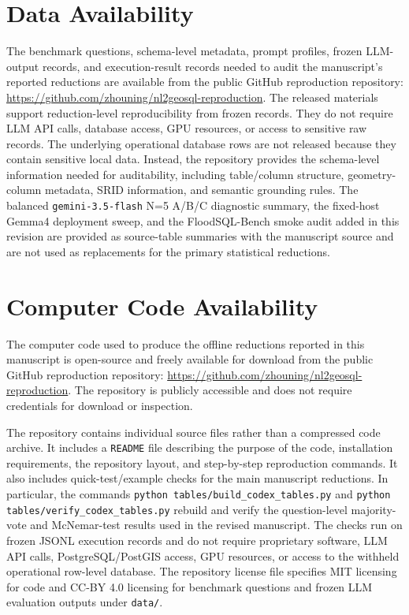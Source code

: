 \documentclass[11pt]{article}
\begin{document}
\section*{Data Availability}

{\sloppy
The benchmark questions, schema-level metadata, prompt profiles, frozen
LLM-output records, and execution-result records needed to audit the
manuscript's reported reductions are available from the public GitHub
reproduction repository:
\url{https://github.com/zhouning/nl2geosql-reproduction}.
The released materials support reduction-level reproducibility from frozen
records. They do not require LLM API calls, database access, GPU resources, or
access to sensitive raw records. The underlying operational database rows are
not released because they contain sensitive local data. Instead, the repository
provides the schema-level information needed for auditability, including
table/column structure, geometry-column metadata, SRID information, and semantic
grounding rules. The balanced \texttt{gemini-3.5-flash} N=5 A/B/C diagnostic
summary, the fixed-host Gemma4 deployment sweep, and the FloodSQL-Bench smoke
audit added in this revision are provided as source-table summaries with the
manuscript source and are not used as replacements for the primary statistical
reductions.
\par}

\section*{Computer Code Availability}

{\sloppy
The computer code used to produce the offline reductions reported in this
manuscript is open-source and freely available for download from the public
GitHub reproduction repository:
\url{https://github.com/zhouning/nl2geosql-reproduction}. The repository is
publicly accessible and does not require credentials for download or inspection.

The repository contains individual source files rather than a compressed code
archive. It includes a \texttt{README} file describing the purpose of the code,
installation requirements, the repository layout, and step-by-step reproduction
commands. It also includes quick-test/example checks for the main manuscript
reductions. In particular, the commands \texttt{python
tables/build\_codex\_tables.py} and \texttt{python
tables/verify\_codex\_tables.py} rebuild and verify the question-level
majority-vote and McNemar-test results used in the revised manuscript. The
checks run on frozen JSONL execution records and do not require proprietary
software, LLM API calls, PostgreSQL/PostGIS access, GPU resources, or access to
the withheld operational row-level database. The repository license file
specifies MIT licensing for code and CC-BY 4.0 licensing for benchmark
questions and frozen LLM evaluation outputs under \texttt{data/}.
\par}



\end{document}
